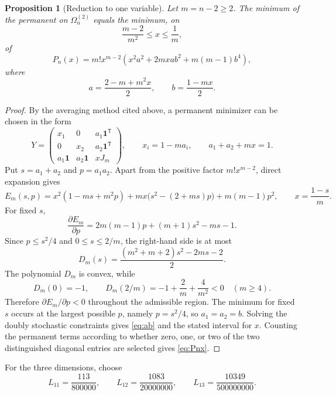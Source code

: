 \documentclass[11pt]{article}
\newtheorem{proposition}[theorem]{Proposition}
\theoremstyle{remark}
\newcommand{\one}{\mathbf 1}
\begin{document}
\begin{proposition}[Reduction to one variable]\label{prop:twozero-poly}
Let $m=n-2\ge2$. The minimum of the permanent on $\Omega_n^{(2)}$ equals the minimum, on
\[
 \frac{m-2}{m^2}\le x\le\frac1m,
\]
of
\begin{equation}\label{eq:Pnx}
 P_n(x)=m!x^{m-2}\left(x^2a^2+2mxab^2+m(m-1)b^4\right),
\end{equation}
where
\begin{equation}\label{eq:ab}
 a=\frac{2-m+m^2x}{2},\qquad b=\frac{1-mx}{2}.
\end{equation}
\end{proposition}
\begin{proof}
By the averaging method cited above, a permanent minimizer can be chosen in the form
\[
 Y=
 \begin{pmatrix}
 x_1&0&a_1\one^{\mathsf T}\\
 0&x_2&a_2\one^{\mathsf T}\\
 a_1\one&a_2\one&xJ_m
 \end{pmatrix},
 \qquad
 x_i=1-ma_i,
 \qquad
 a_1+a_2+mx=1.
\]
Put $s=a_1+a_2$ and $p=a_1a_2$. Apart from the positive factor $m!x^{m-2}$, direct expansion gives
\begin{equation}\label{eq:E-sp}
 E_m(s,p)=x^2(1-ms+m^2p)+mx\bigl(s^2-(2+ms)p\bigr)+m(m-1)p^2,
 \qquad x=\frac{1-s}{m}.
\end{equation}
For fixed $s$,
\begin{equation}\label{eq:dEdp}
 \frac{\partial E_m}{\partial p}
 =2m(m-1)p+(m+1)s^2-ms-1.
\end{equation}
Since $p\le s^2/4$ and $0\le s\le2/m$, the right-hand side is at most
\[
 D_m(s)=\frac{(m^2+m+2)s^2-2ms-2}{2}.
\]
The polynomial $D_m$ is convex, while
\[
 D_m(0)=-1,
 \qquad
 D_m(2/m)=-1+\frac2m+\frac4{m^2}<0
 \quad(m\ge4).
\]
Therefore $\partial E_m/\partial p<0$ throughout the admissible region. The minimum for fixed $s$ occurs at the largest possible $p$, namely $p=s^2/4$, so $a_1=a_2=b$. Solving the doubly stochastic constraints gives \eqref{eq:ab} and the stated interval for $x$. Counting the permanent terms according to whether zero, one, or two of the two distinguished diagonal entries are selected gives \eqref{eq:Pnx}.
\end{proof}

For the three dimensions, choose
\begin{equation}\label{eq:L-values}
 L_{11}=\frac{113}{800000},\qquad
 L_{12}=\frac{1083}{20000000},\qquad
 L_{13}=\frac{10349}{500000000}.
\end{equation}
\end{document}
